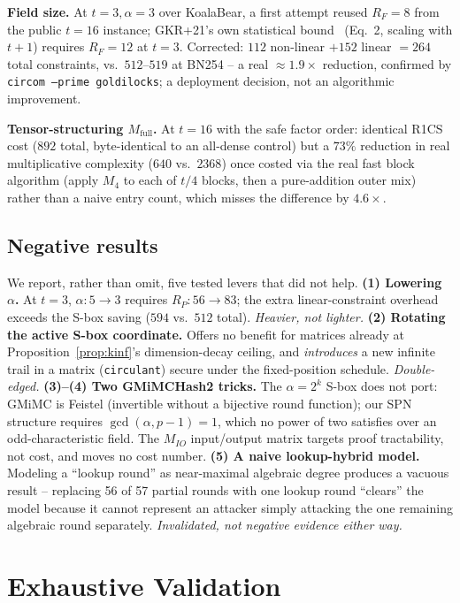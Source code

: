 \documentclass[conference]{IEEEtran}
\theoremstyle{definition}
\theoremstyle{plain}
\begin{document}
\textbf{Field size.} At $t=3,\alpha=3$ over KoalaBear, a first attempt
reused $R_F=8$ from the public $t=16$ instance; GKR+21's own statistical
bound~\cite{poseidon2021} (Eq.~2, scaling with $t+1$) requires $R_F=12$
at $t=3$. Corrected: $112$ non-linear $+152$ linear $=264$ total
constraints, vs.\ $512$--$519$ at BN254 -- a real
$\approx1.9\times$ reduction, confirmed by
\texttt{circom --prime goldilocks}; a deployment decision, not an
algorithmic improvement.

\textbf{Tensor-structuring $M_{\mathrm{full}}$.} At $t=16$ with the safe
factor order: identical R1CS cost ($892$ total, byte-identical to an
all-dense control) but a $73\%$ reduction in real multiplicative
complexity ($640$ vs.\ $2368$) once costed via the real fast block
algorithm (apply $M_4$ to each of $t/4$ blocks, then a pure-addition
outer mix) rather than a naive entry count, which misses the difference
by $4.6\times$.

\subsection{Negative results}
\label{sec:levers}
We report, rather than omit, five tested levers that did not help.
\textbf{(1) Lowering $\alpha$.} At $t=3$, $\alpha{:}5{\to}3$ requires
$R_P{:}56{\to}83$; the extra linear-constraint overhead exceeds the
S-box saving ($594$ vs.\ $512$ total). \emph{Heavier, not lighter.}
\textbf{(2) Rotating the active S-box coordinate.} Offers no benefit for
matrices already at Proposition~\ref{prop:kinf}'s dimension-decay
ceiling, and \emph{introduces} a new infinite trail in a matrix
(\texttt{circulant}) secure under the fixed-position schedule.
\emph{Double-edged.} \textbf{(3)--(4) Two GMiMCHash2 tricks.} The
$\alpha=2^k$ S-box does not port: GMiMC is Feistel (invertible without a
bijective round function); our SPN structure requires
$\gcd(\alpha,p-1)=1$, which no power of two satisfies over an
odd-characteristic field. The $M_{IO}$ input/output matrix targets proof
tractability, not cost, and moves no cost number. \textbf{(5) A naive
lookup-hybrid model.} Modeling a ``lookup round'' as near-maximal
algebraic degree produces a vacuous result -- replacing 56 of 57 partial
rounds with one lookup round ``clears'' the model because it cannot
represent an attacker simply attacking the one remaining algebraic round
separately. \emph{Invalidated, not negative evidence either way.}

\section{Exhaustive Validation}
\label{sec:battery}
\end{document}
